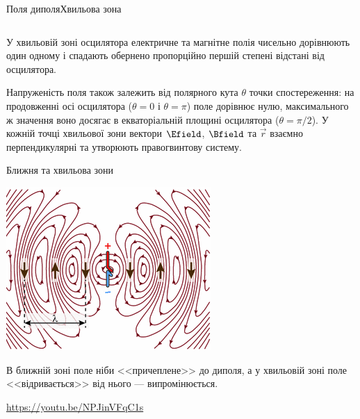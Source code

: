 \documentclass[9pt]{beamer}
\let\vect\vec
\begin{document}
\begin{frame}{Поля диполя}{Хвильова зона}
\begin{columns}
\begin{column}{0.3\linewidth}
\begin{overprint}
\begin{center}
				\end{center}
			\end{overprint}
		\end{column}
	\end{columns}
	\begin{overprint}
		\begin{alertblock}{}\scriptsize\justifying
			У хвильовій зоні осцилятора електричне та магнітне полія чисельно дорівнюють один одному і спадають обернено пропорційно першій степені відстані від осцилятора.
		\end{alertblock}
		\begin{alertblock}{}\scriptsize\justifying
			Напруженість поля також залежить від полярного
			кута $\theta$ точки спостереження: на продовженні осі осцилятора ($ \theta = 0 $ і $ \theta = \pi $) поле дорівнює нулю, максимального ж
			значення воно досягає в екваторіальній площині осцилятора ($ \theta = \pi/2 $). У кожній точці хвильової зони вектори $ \Efield $, $ \Bfield $ та $ \vect{r} $ взаємно перпендикулярні та утворюють правогвинтову систему.
		\end{alertblock}
	\end{overprint}

\end{frame}





\begin{frame}{Ближня та хвильова зони}{}
	\begin{center}
		\includegraphics[width=0.5\linewidth]{dipole_radiation}
	\end{center}
	\begin{block}{}\justifying
		В ближній зоні поле ніби <<причеплене>> до диполя, а у хвильовій зоні поле <<відривається>> від нього --- випромінюється.
	\end{block}

	\vfill

	{\tiny \url{https://youtu.be/NPJinVFqC1s}}
\end{frame}
\end{document}
